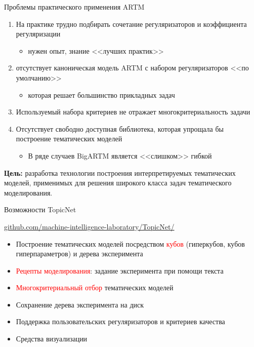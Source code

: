 \begin{frame}[t]{Проблемы практического применения ARTM}

\begin{enumerate}
    \item{На практике трудно подбирать сочетание регуляризаторов и коэффициента регуляризации \begin{itemize}
        \item {нужен опыт, знание <<лучших практик>>}
    \end{itemize}}
    \item{ отсутствует каноническая модель ARTM с набором регуляризаторов <<по умолчанию>> \begin{itemize}
        \item {которая решает большинство прикладных задач}
    \end{itemize}}
    \item{ Используемый набора критериев не отражает многокритериальность задачи}
    \item{Отсутствует свободно доступная библиотека, которая упрощала бы построение тематических моделей \begin{itemize}
        \item {В ряде случаев BigARTM является <<слишком>> гибкой}
    \end{itemize}}
\end{enumerate}
\textbf{Цель:} разработка технологии построения интерпретируемых  тематических моделей, применимых для решения широкого класса задач тематического моделирования.

\end{frame}




\begin{frame}{Возможности TopicNet}

\textcolor{blue}{\url{github.com/machine-intelligence-laboratory/TopicNet/}}
\bigskip
\begin{itemize}
    \item{Построение тематических моделей посредством \textcolor{red}{кубов} (гиперкубов, кубов гиперпараметров) и дерева эксперимента}
    \item{\textcolor{red}{Рецепты моделирования}: задание эксперимента при помощи текста}
    \item{\textcolor{red}{Многокритериальный отбор} тематических моделей}
    \item{Сохранение дерева эксперимента на диск}
    \item{Поддержка пользовательских регуляризаторов и критериев качества}
    \item{Средства визуализации}
\end{itemize}
\end{frame}


